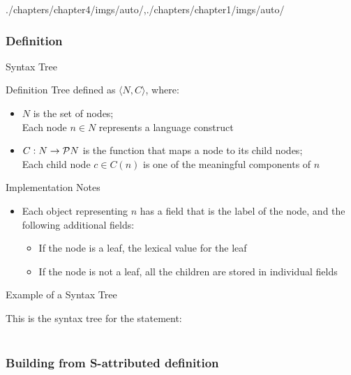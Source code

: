 \begin{graphicspathcontext}{{./chapters/chapter4/imgs/auto/},{./chapters/chapter1/imgs/auto/}}
\begin{bibunit}[apalike]
\subsubsection{Definition}
\subsubsectiontableofcontentslide

\begin{frame}{Syntax Tree}
	\begin{definitionblock}{Definition}
		Tree defined as $\langle N, C \rangle$, where:
		\begin{itemize}
			\item $N$ is the set of nodes; \\
				Each node $n \in N$ represents a language construct
			\item $C : N \rightarrow \mathcal{P}{N}$ is the function that maps a node to its child nodes; \\
				Each child node $c \in C(n)$ is one of the meaningful components of $n$
		\end{itemize}
	\end{definitionblock}
	\vspace{.5cm}
	\begin{block}{Implementation Notes}
		\begin{itemize}
		\item Each object representing $n$ has a field that is the label of the node, and the following additional fields:
			\begin{itemize}
			\item If the node is a leaf, the lexical value for the leaf
			\item If the node is not a leaf, all the children are stored in individual fields
			\end{itemize}
		\end{itemize}
	\end{block}
\end{frame}

\begin{frame}{Example of a Syntax Tree}
	\begin{center}
		This is the syntax tree for the statement: \\
			 \\[2em]
	\end{center}
\end{frame}

\subsubsection{Building from S-attributed definition}
\subsubsectiontableofcontentslide


\end{bibunit}
\end{graphicspathcontext}
